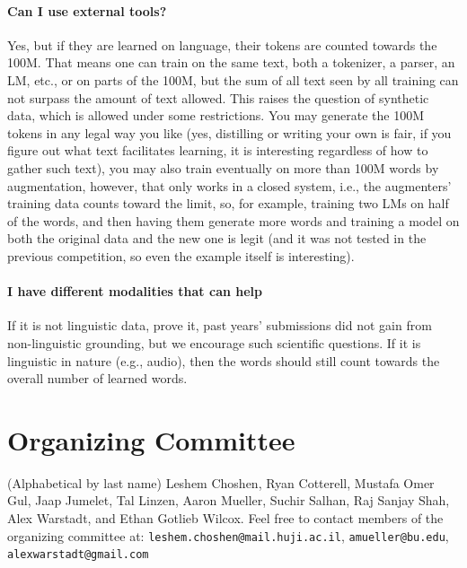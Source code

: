 \documentclass[11pt]{article}
\newcommand{\strict}[1]{\textsc{Strict}}
\newcommand{\strictsmall}[1]{\textsc{Strict-small}}
\newcommand{\vision}[1]{\textsc{Multimodal}}
\newcommand{\interact}[1]{\textsc{Interaction}}
\begin{document}

\paragraph{Can I use external tools?}
Yes, but if they are learned on language, their tokens are counted towards the 100M. That means one can train on the same text, both a tokenizer, a parser, an LM, etc., or on parts of the 100M, but the sum of all text seen by all training can not surpass the amount of text allowed. This raises the question of synthetic data, which is allowed under some restrictions. You may generate the 100M tokens in any legal way you like (yes, distilling or writing your own is fair, if you figure out what text facilitates learning, it is interesting regardless of how to gather such text), you may also train eventually on more than 100M words by augmentation, however, that only works in a closed system, i.e., the augmenters' training data counts toward the limit, so, for example, training two LMs on half of the words, and then having them generate more words and training a model on both the original data and the new one is legit (and it was not tested in the previous competition, so even the example itself is interesting).

\paragraph{I have different modalities that can help}
If it is not linguistic data, prove it, past years' submissions did not gain from non-linguistic grounding, but we encourage such scientific questions. If it is linguistic in nature (e.g., audio), then the words should still count towards the overall number of learned words.

\section{Organizing Committee}
(Alphabetical by last name) Leshem Choshen, Ryan Cotterell, Mustafa Omer Gul, Jaap Jumelet, Tal Linzen, Aaron Mueller, Suchir Salhan, Raj Sanjay Shah, Alex Warstadt, and Ethan Gotlieb Wilcox. Feel free to contact members of the organizing committee at: \texttt{leshem.choshen@mail.huji.ac.il}, \texttt{amueller@bu.edu}, \texttt{alexwarstadt@gmail.com}





\end{document}
